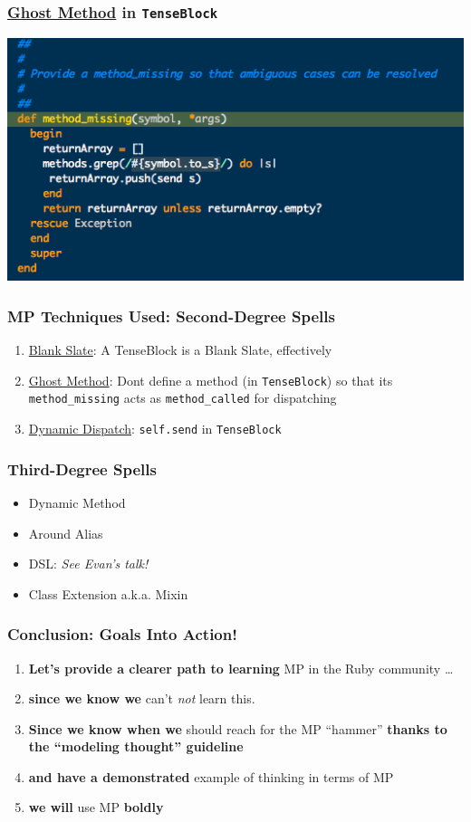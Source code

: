 \documentclass[slidestop,compress,mathserif]{beamer}
\begin{document}
\begin{frame}
	\frametitle{\underline{Ghost Method} in \texttt{TenseBlock}}
	\begin{center}
		\includegraphics[scale=0.45]{img/tenseblock_mm.png}
	\end{center}
\end{frame}

\begin{frame}
	\frametitle{MP Techniques Used:  Second-Degree Spells}
	\begin{enumerate}
		\item \underline{Blank Slate}:  A TenseBlock is a Blank Slate, effectively
		\item \underline{Ghost Method}:  Dont define a method (in \texttt{TenseBlock}) so that its \texttt{method\_missing} acts as \texttt{method\_called} for dispatching
		\item \underline{Dynamic Dispatch}:  \texttt{self.send} in \texttt{TenseBlock}
	\end{enumerate}
\end{frame}

\begin{frame}
	\frametitle{Third-Degree Spells}
	\begin{itemize}
		\item Dynamic Method
		\item Around Alias
		\item DSL:  \emph{See Evan's talk!}
		\item Class Extension a.k.a. Mixin
	\end{itemize}
\end{frame}

\begin{frame}
	\frametitle{Conclusion:  Goals Into Action!}
	\begin{enumerate}
		\item \textbf{Let's provide a clearer path to learning} MP in the Ruby community \ldots
		\pause
		\item \textbf{since we know we} can't \emph{not} learn this.
		\pause
		\item \textbf{Since we know when we} should reach for the MP ``hammer'' \textbf{thanks to the ``modeling thought'' guideline}
		\pause
		\item \textbf{and have a demonstrated} example of thinking in terms of MP
		\pause
		\item \textbf{we will} use MP \textbf{boldly}
	\end{enumerate}
\end{frame}
\end{document}

